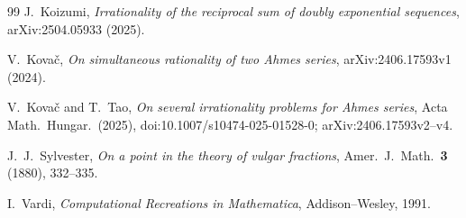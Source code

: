 \documentclass[11pt]{amsart}
\theoremstyle{definition}
\theoremstyle{remark}
\begin{document}
\begin{thebibliography}{99}
J.~Koizumi, \emph{Irrationality of the reciprocal sum of doubly exponential sequences},
arXiv:2504.05933 (2025).

V.~Kova\v{c}, \emph{On simultaneous rationality of two Ahmes series},
arXiv:2406.17593v1 (2024).

V.~Kova\v{c} and T.~Tao, \emph{On several irrationality problems for Ahmes series},
Acta Math.\ Hungar.\ (2025), doi:10.1007/s10474-025-01528-0; arXiv:2406.17593v2--v4.

J.~J.~Sylvester, \emph{On a point in the theory of vulgar fractions},
Amer.\ J.\ Math.\ \textbf{3} (1880), 332--335.

I.~Vardi, \emph{Computational Recreations in Mathematica}, Addison--Wesley, 1991.

\end{thebibliography}
\end{document}
